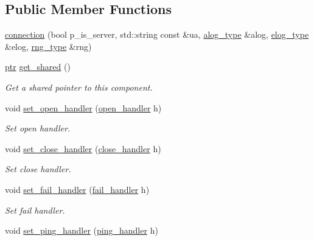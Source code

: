 \subsection*{Public Member Functions}
\begin{DoxyCompactItemize}
\item 
\hyperlink{classwebsocketpp_1_1connection_a525947d8d33ee1e410d02706246ffe94}{connection} (bool p\+\_\+is\+\_\+server, std\+::string const \&ua, \hyperlink{classwebsocketpp_1_1connection_a2da7d18aecf9153429bab9fcd2bab7b8}{alog\+\_\+type} \&alog, \hyperlink{classwebsocketpp_1_1connection_a80314ab2e4ddefdd4783fb1934fedee6}{elog\+\_\+type} \&elog, \hyperlink{classwebsocketpp_1_1connection_afc276f2f61d5b1acfadc64f91b3f89e5}{rng\+\_\+type} \&rng)
\item 
\hyperlink{classwebsocketpp_1_1connection_ab910d42e3bde91546183cc54642f32ab}{ptr} \hyperlink{classwebsocketpp_1_1connection_a01a5af7dc2f35ff8f15da8c2cf3a3b02}{get\+\_\+shared} ()
\begin{DoxyCompactList}\small\item\em Get a shared pointer to this component. \end{DoxyCompactList}\item 
void \hyperlink{classwebsocketpp_1_1connection_ab11271e7778fbfde3a1987fca729af6d}{set\+\_\+open\+\_\+handler} (\hyperlink{namespacewebsocketpp_a53c8b4ae59cf13b5f883b119bbd14d72}{open\+\_\+handler} h)
\begin{DoxyCompactList}\small\item\em Set open handler. \end{DoxyCompactList}\item 
void \hyperlink{classwebsocketpp_1_1connection_a25fb7096431b1d7350c34035db7ed9a4}{set\+\_\+close\+\_\+handler} (\hyperlink{namespacewebsocketpp_a27acb39e01cbca06ccc4e4e8eb8f877d}{close\+\_\+handler} h)
\begin{DoxyCompactList}\small\item\em Set close handler. \end{DoxyCompactList}\item 
void \hyperlink{classwebsocketpp_1_1connection_a8d2515bc6821f90c531efe77c8a32569}{set\+\_\+fail\+\_\+handler} (\hyperlink{namespacewebsocketpp_a5bb2e61cfe649b2e012f1a2c5693a4d5}{fail\+\_\+handler} h)
\begin{DoxyCompactList}\small\item\em Set fail handler. \end{DoxyCompactList}\item 
void \hyperlink{classwebsocketpp_1_1connection_a6e21e63abbbba88f818742e9da25fa8b}{set\+\_\+ping\+\_\+handler} (\hyperlink{namespacewebsocketpp_a9dcaaa7370865f1bcacb55ae715793ef}{ping\+\_\+handler} h)

\end{DoxyCompactItemize}
